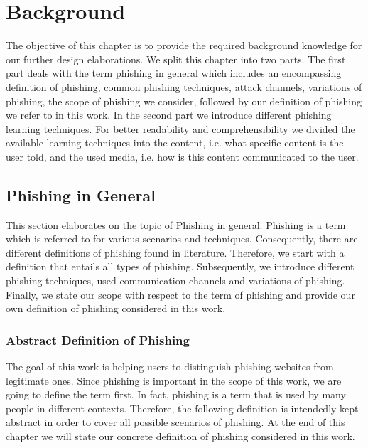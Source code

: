 \section{Background}
\label{s:background}
The objective of this chapter is to provide the required background knowledge for our further design elaborations. 
We split this chapter into two parts.
The first part deals with the term phishing in general which includes an encompassing definition of phishing, common phishing techniques, attack channels, variations of phishing, the scope of phishing we consider, followed by our definition of phishing we refer to in this work.
In the second part we introduce different phishing learning techniques.
For better readability and comprehensibility we divided the available learning techniques into the content, i.e. what specific content is the user told, and the used media, i.e. how is this content communicated to the user.


\subsection{Phishing in General}
\label{s:phishing_general}
This section elaborates on the topic of Phishing in general.
Phishing is a term which is referred to for various scenarios and techniques.
Consequently, there are different definitions of phishing found in literature.
Therefore, we start with a definition that entails all types of phishing.
Subsequently, we introduce different phishing techniques, used communication channels and variations of phishing.
Finally, we state our scope with respect to the term of phishing and provide our own definition of phishing considered in this work.
\subsubsection{Abstract Definition of Phishing}
\label{s:phishing_def}
The goal of this work is helping users to distinguish phishing websites from legitimate ones. 
 Since phishing is important in the scope of this work, we are going to define the term first. In fact, phishing is a term that is used by many people in different contexts. Therefore, the following definition is intendedly kept abstract in order to cover all possible scenarios of phishing. At the end of this chapter we will state our concrete definition of phishing  considered in this work.

